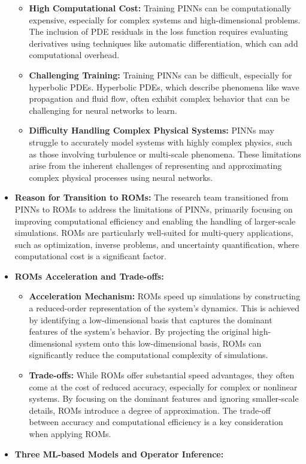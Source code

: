 \documentclass[
]{article}
\begin{document}
\begin{itemize}
\begin{itemize}
  \item
    \textbf{High Computational Cost:} Training PINNs can be
    computationally expensive, especially for complex systems and
    high-dimensional problems. The inclusion of PDE residuals in the
    loss function requires evaluating derivatives using techniques like
    automatic differentiation, which can add computational overhead.
  \item
    \textbf{Challenging Training:} Training PINNs can be difficult,
    especially for hyperbolic PDEs. Hyperbolic PDEs, which describe
    phenomena like wave propagation and fluid flow, often exhibit
    complex behavior that can be challenging for neural networks to
    learn.
  \item
    \textbf{Difficulty Handling Complex Physical Systems:} PINNs may
    struggle to accurately model systems with highly complex physics,
    such as those involving turbulence or multi-scale phenomena. These
    limitations arise from the inherent challenges of representing and
    approximating complex physical processes using neural networks.
  \end{itemize}
\item
  \textbf{Reason for Transition to ROMs:} The research team transitioned
  from PINNs to ROMs to address the limitations of PINNs, primarily
  focusing on improving computational efficiency and enabling the
  handling of larger-scale simulations. ROMs are particularly
  well-suited for multi-query applications, such as optimization,
  inverse problems, and uncertainty quantification, where computational
  cost is a significant factor.
\item
  \textbf{ROMs Acceleration and Trade-offs:}

  \begin{itemize}
  
  \item
    \textbf{Acceleration Mechanism:} ROMs speed up simulations by
    constructing a reduced-order representation of the system's
    dynamics. This is achieved by identifying a low-dimensional basis
    that captures the dominant features of the system's behavior. By
    projecting the original high-dimensional system onto this
    low-dimensional basis, ROMs can significantly reduce the
    computational complexity of simulations.
  \item
    \textbf{Trade-offs:} While ROMs offer substantial speed advantages,
    they often come at the cost of reduced accuracy, especially for
    complex or nonlinear systems. By focusing on the dominant features
    and ignoring smaller-scale details, ROMs introduce a degree of
    approximation. The trade-off between accuracy and computational
    efficiency is a key consideration when applying ROMs.
  \end{itemize}
\item
  \textbf{Three ML-based Models and Operator Inference:}


\end{itemize}
\end{document}
